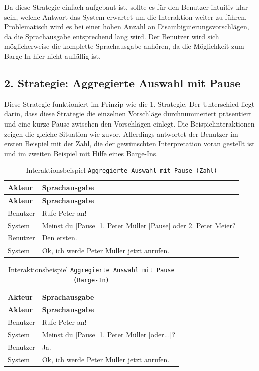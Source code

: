 \documentclass[12pt,a4paper]{scrartcl}
\begin{document}
Da diese Strategie einfach aufgebaut ist, sollte es für den Benutzer intuitiv klar sein, welche Antwort das System erwartet um die Interaktion weiter zu führen. Problematisch wird es bei einer hohen Anzahl an Disambiguierungsvorschlägen, da die Sprachausgabe entsprechend lang wird. Der Benutzer wird sich möglicherweise die komplette Sprachausgabe anhören, da die Möglichkeit zum Barge-In hier nicht auffällig ist. 
  

\subsection{2. Strategie: Aggregierte Auswahl mit Pause}
Diese Strategie funktioniert im Prinzip wie die 1. Strategie. Der Unterschied liegt darin, dass diese Strategie die einzelnen Vorschläge durchnummeriert präsentiert und eine kurze Pause zwischen den Vorschlägen einlegt. Die Beispielinteraktionen zeigen die gleiche Situation wie zuvor. Allerdings antwortet der Benutzer im ersten Beispiel mit der Zahl, die der gewünschten Interpretation voran gestellt ist und im zweiten Beispiel mit Hilfe eines Barge-Ins.\\

\begin{longtable}{p{6cm}p{8cm}}
	\caption[Interaktionsbeispiel \texttt{Aggregierte Auswahl mit Pause (Zahl)}]{Interaktionsbeispiel \texttt{Aggregierte Auswahl mit Pause (Zahl)}}\\
	\hline
	\textbf{Akteur} &	\textbf{Sprachausgabe}\\
	\hline
	\endfirsthead
	\hline
	\textbf{Akteur} &	\textbf{Sprachausgabe}\\
	\hline
	\endhead
Benutzer & Rufe Peter an!\\
System & Meinst du [Pause] 1. Peter Müller [Pause] oder 2. Peter Meier?\\
Benutzer & Den ersten.\\
System & Ok, ich werde Peter Müller jetzt anrufen.\\

\hline
\end{longtable}

\begin{longtable}{p{6cm}p{8cm}}
	\caption[Interaktionsbeispiel \texttt{Aggregierte Auswahl mit Pause (Barge-In)}]{Interaktionsbeispiel \texttt{Aggregierte Auswahl mit Pause (Barge-In)}}\\
	\hline
	\textbf{Akteur} &	\textbf{Sprachausgabe}\\
	\hline
	\endfirsthead
	\hline
	\textbf{Akteur} &	\textbf{Sprachausgabe}\\
	\hline
	\endhead
Benutzer & Rufe Peter an!\\
System & Meinst du [Pause] 1. Peter Müller [oder...]?\\
Benutzer & Ja.\\
System & Ok, ich werde Peter Müller jetzt anrufen.\\

\hline
\end{longtable}
\end{document}
